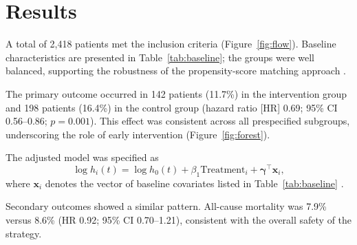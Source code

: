 \section{Results}
\label{sec:results}

A total of 2,418 patients met the inclusion criteria (Figure~\ref{fig:flow}). Baseline characteristics are presented in Table~\ref{tab:baseline}; the groups were well balanced, supporting the robustness of the propensity-score matching approach \cite{austin2011introduction}.

The primary outcome occurred in 142 patients (11.7\%) in the intervention group and 198 patients (16.4\%) in the control group (hazard ratio [HR] 0.69; 95\% CI 0.56--0.86; $p = 0.001$). This effect was consistent across all prespecified subgroups, underscoring the role of early intervention (Figure~\ref{fig:forest}).

The adjusted model was specified as
\begin{equation}
  \log h_i(t) = \log h_0(t) + \beta_1 \text{Treatment}_i + \boldsymbol{\gamma}^\top \mathbf{x}_i ,
  \label{eq:cox}
\end{equation}
where $\mathbf{x}_i$ denotes the vector of baseline covariates listed in Table~\ref{tab:baseline} \cite{cox1972regression, therneau2000modeling}.

Secondary outcomes showed a similar pattern. All-cause mortality was 7.9\% versus 8.6\% (HR 0.92; 95\% CI 0.70--1.21), consistent with the overall safety of the strategy.
